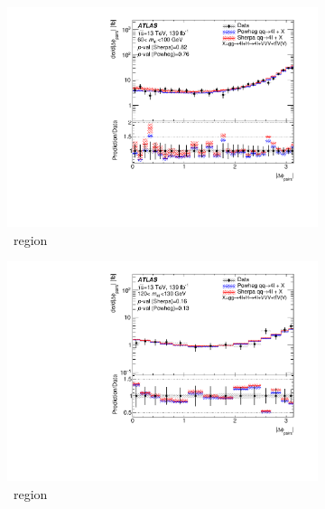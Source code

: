 \begin{figure}[htb!]
    \begin{subfigure}{.49\textwidth}\centering
      \includegraphics[width=.99\linewidth]{Figures/m4l/UnfoldedResults/Unfolded_Data_deltaPhiPairs_m4l60-100.pdf}\caption{\ZFourL \ region}\label{fig:sub-first}
    \end{subfigure}
    \begin{subfigure}{.49\textwidth}\centering
      \includegraphics[width=.99\linewidth]{Figures/m4l/UnfoldedResults/Unfolded_Data_deltaPhiPairs_m4l120-130.pdf} \caption{\HFourL \ region}\label{fig:sub-second}
    \end{subfigure}
    \begin{subfigure}{.49\textwidth}\centering

\end{subfigure}
\end{figure}
